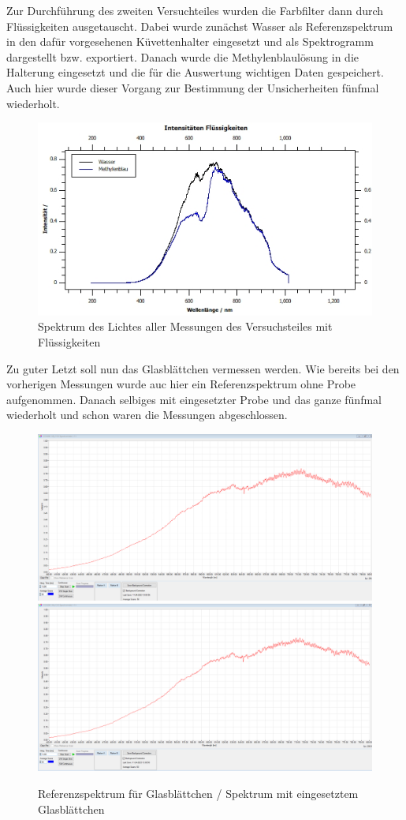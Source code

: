 \documentclass[12pt,a4paper,twoside]{article}
\begin{document}
\noindent
Zur Durchführung des zweiten Versuchteiles wurden die Farbfilter dann durch Flüssigkeiten ausgetauscht. Dabei wurde zunächst Wasser als Referenzspektrum in den dafür vorgesehenen Küvettenhalter eingesetzt und als Spektrogramm dargestellt bzw. exportiert.
Danach wurde die Methylenblaulösung in die Halterung eingesetzt und die für die Auswertung wichtigen Daten gespeichert. Auch hier wurde dieser Vorgang zur Bestimmung der Unsicherheiten fünfmal wiederholt. \newline

\begin{figure}[H]
    \centering
    \includegraphics[width=0.6\linewidth]{nudes/qti-Intensitäten-Flüssigkeiten.jpg}
    \caption{Spektrum des Lichtes aller Messungen des Versuchsteiles mit Flüssigkeiten}
    \label{fig:Alle3.2Bilder}
\end{figure}

\noindent
Zu guter Letzt soll nun das Glasblättchen vermessen werden. Wie bereits bei den vorherigen Messungen wurde auc hier ein Referenzspektrum ohne Probe aufgenommen. Danach selbiges mit eingesetzter Probe und das ganze fünfmal wiederholt und schon waren die Messungen abgeschlossen. 

\begin{figure}[H]
    \centering
    \includegraphics[width=0.4\linewidth]{nudes/Verlauf-ReferenzspektrumGlas.PNG}
    \includegraphics[width=0.4\linewidth]{nudes/Verlauf-Glas.PNG}
    \caption{Referenzspektrum für Glasblättchen / Spektrum mit eingesetztem Glasblättchen}
    \label{fig:MessungenGlas}
\end{figure}
\end{document}

